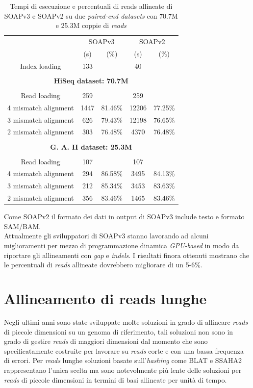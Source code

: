 \documentclass[conference]{IEEEtran}
\begin{document}
\begin{table}[!ht]
\begin{center}
\begin{tabular}{ccccc}
& \multicolumn{2}{c}{SOAPv3} & \multicolumn{2}{c}{SOAPv2} \\
& (s) & (\%) & (s) & (\%) \\
Index loading & 133 & & 40 & \\
&&&&\\
\multicolumn{5}{c}{\textbf{HiSeq dataset: 70.7M}}\\
&&&&\\
Read loading & 259 & & 259 & \\
4 mismatch alignment & 1447 & 81.46\% & 12206 & 77.25\% \\
3 mismatch alignment & 626 & 79.43\% & 12198 & 76.65\% \\
2 mismatch alignment & 303 & 76.48\% & 4370 & 76.48\% \\
&&&&\\
\multicolumn{5}{c}{\textbf{G. A. II dataset: 25.3M}}\\
&&&&\\
Read loading & 107 & & 107 & \\
4 mismatch alignment & 294 & 86.58\% & 3495 & 84.13\% \\
3 mismatch alignment & 212 & 85.34\% & 3453 & 83.63\% \\
2 mismatch alignment & 356 & 83.46\% & 1465 & 83.46\% \\
\end{tabular}
\end{center}
\caption{Tempi di esecuzione e percentuali di reads allineate di SOAPv3 e SOAPv2 su due \textit{paired-end datasets} con 70.7M e 25.3M coppie di \textit{reads}}
\label{tab:SOAPv3vsSOAPv2}
\end{table}

Come SOAPv2 il formato dei dati in output di SOAPv3 include testo e formato SAM/BAM.\\

Attualmente gli sviluppatori di SOAPv3 stanno lavorando ad alcuni miglioramenti per mezzo di programmazione dinamica \textit{GPU-based} in modo da riportare gli allineamenti con \textit{gap} e \textit{indels}. I risultati finora ottenuti mostrano che le percentuali di \textit{reads} allineate dovrebbero migliorare di un 5-6\%.

\section{\textbf{Allineamento di reads lunghe}}
Negli ultimi anni sono state sviluppate molte soluzioni in grado di allineare \textit{reads} di piccole dimensioni su un genoma di riferimento, tali soluzioni non sono in grado di gestire \textit{reads} di maggiori dimensioni dal momento che sono specificatamente costruite per lavorare su \textit{reads} corte e con una bassa frequenza di errori. Per \textit{reads} lunghe soluzioni basate sull'\textit{hashing} come BLAT e SSAHA2 rappresentano l'unica scelta ma sono notevolmente più lente delle soluzioni per \textit{reads} di piccole dimensioni in termini di basi allineate per unità di tempo.\\
\end{document}
